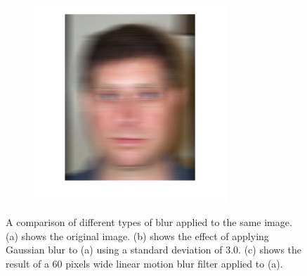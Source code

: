 \begin{figure}[H]
\begin{subfigure}{.30\textwidth}
  \caption{}
\end{subfigure}%
\begin{subfigure}{.30\textwidth}
  \centering
  \includegraphics[width=0.8\textwidth]{img/blur_test/motion_img.png}
  \caption{}
\end{subfigure}%
\caption{A comparison of different types of blur applied to the same image. (a) shows the original image. (b) shows the effect of applying Gaussian blur to (a) using a standard deviation of 3.0. (c) shows the result of a 60 pixels wide linear motion blur filter applied to (a).}
\label{fig:fr_result_images}
\end{figure}
